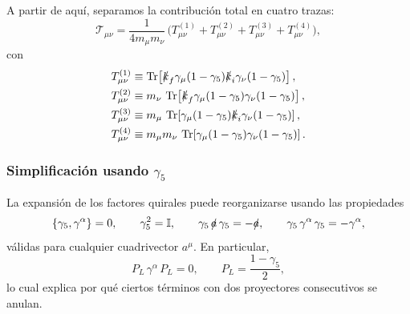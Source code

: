 A partir de aquí, separamos la contribución total en cuatro trazas:
\begin{equation}
\mathcal{T}_{\mu \nu}=\frac{1}{4m_\mu m_\nu}\,
\Big(T_{\mu \nu}^{(1)}+T_{\mu \nu}^{(2)}+T_{\mu \nu}^{(3)}+T_{\mu \nu}^{(4)}\Big),
\label{eq:app_T_mu0_split}
\end{equation}
con
\begin{align}
T_{\mu \nu}^{(1)}
&\equiv
\Tr\!\left[\slashed{k}_f\gamma_\mu(1-\gamma_5)\slashed{k}_i\gamma_\nu(1-\gamma_5)\right],
\label{eq:app_T_red}
\\
T_{\mu \nu}^{(2)}
&\equiv
m_\nu\,\Tr\!\left[\slashed{k}_f\gamma_\mu(1-\gamma_5)\gamma_\nu(1-\gamma_5)\right],
\label{eq:app_T_blue}
\\
T_{\mu \nu}^{(3)}
&\equiv
m_\mu\,\Tr\!\left[\gamma_\mu(1-\gamma_5)\slashed{k}_i\gamma_\nu(1-\gamma_5)\right],
\label{eq:app_T_green}
\\
T_{\mu \nu}^{(4)}
&\equiv
m_\mu m_\nu\,\Tr\!\left[\gamma_\mu(1-\gamma_5)\gamma_\nu(1-\gamma_5)\right].
\label{eq:app_T_purple}
\end{align}

\subsubsection*{Simplificación usando $\gamma_5$}
\label{app:trazas:simplificacion_gamma5}

La expansión de los factores quirales puede reorganizarse usando las propiedades
\begin{equation}
\{\gamma_5,\gamma^\alpha\}=0,
\qquad
\gamma_5^2=\mathbb{I},
\qquad
\gamma_5\,\slashed{a}\,\gamma_5=-\slashed{a},
\qquad
\gamma_5\,\gamma^\alpha\,\gamma_5=-\gamma^\alpha,
\label{eq:gamma5_identities}
\end{equation}
válidas para cualquier cuadrivector \(a^\mu\). En particular,
\begin{equation}
P_L\,\gamma^\alpha\,P_L=0,
\qquad
P_L=\frac{1-\gamma_5}{2},
\label{eq:PLgammaPL_zero}
\end{equation}
lo cual explica por qué ciertos términos con dos proyectores consecutivos se anulan.

